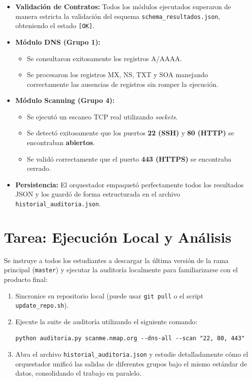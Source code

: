 \documentclass[12pt,a4paper]{article}
\begin{document}
\begin{itemize}[label=$\bullet$]
    \item \textbf{Validación de Contratos:} Todos los módulos ejecutados superaron de manera estricta la validación del esquema \texttt{schema\_resultados.json}, obteniendo el estado \texttt{[OK]}.
    
    \item \textbf{Módulo DNS (Grupo 1):} 
    \begin{itemize}[label=--]
        \item Se consultaron exitosamente los registros A/AAAA.
        \item Se procesaron los registros MX, NS, TXT y SOA manejando correctamente las ausencias de registros sin romper la ejecución.
    \end{itemize}

    \item \textbf{Módulo Scanning (Grupo 4):}
    \begin{itemize}[label=--]
        \item Se ejecutó un escaneo TCP real utilizando \textit{sockets}.
        \item Se detectó exitosamente que los puertos \textbf{22 (SSH)} y \textbf{80 (HTTP)} se encontraban \textbf{abiertos}.
        \item Se validó correctamente que el puerto \textbf{443 (HTTPS)} se encontraba cerrado.
    \end{itemize}
    
    \item \textbf{Persistencia:} El orquestador empaquetó perfectamente todos los resultados JSON y los guardó de forma estructurada en el archivo \texttt{historial\_auditoria.json}.
\end{itemize}

\section*{Tarea: Ejecución Local y Análisis}

Se instruye a todos los estudiantes a descargar la última versión de la rama principal (\texttt{master}) y ejecutar la auditoría localmente para familiarizarse con el producto final:

\begin{enumerate}
    \item Sincronice su repositorio local (puede usar \texttt{git pull} o el script \texttt{update\_repo.sh}).
    \item Ejecute la suite de auditoría utilizando el siguiente comando:
    \begin{verbatim}
python auditoria.py scanme.nmap.org --dns-all --scan "22, 80, 443"
    \end{verbatim}
    \item Abra el archivo \texttt{historial\_auditoria.json} y estudie detalladamente cómo el orquestador unificó las salidas de diferentes grupos bajo el mismo estándar de datos, consolidando el trabajo en paralelo.
\end{enumerate}
\end{document}
